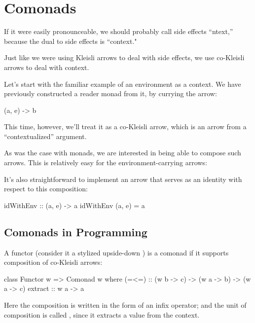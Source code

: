 \documentclass[DaoFP]{subfiles}
\begin{document}
\setcounter{chapter}{15}

\chapter{Comonads}

If it were easily pronounceable, we should probably call side effects ``ntext,'' because the dual to side effects is ``context."

Just like we were using Kleisli arrows to deal with side effects, we use co-Kleisli arrows to deal with context. 

Let's start with the familiar example of an environment as a context. We have previously constructed a reader monad from it, by currying the arrow:
\begin{haskell}
(a, e) -> b
\end{haskell}
This time, however, we'll treat it as a co-Kleisli arrow, which is an arrow from a ``contextualized'' argument.

As was the case with monads, we are interested in being able to compose such arrows. This is relatively easy for the environment-carrying arrows:

It's also straightforward to implement an arrow that serves as an identity with respect to this composition:

\begin{haskell}
idWithEnv :: (a, e) -> a
idWithEnv (a, e) = a
\end{haskell}

\section{Comonads in Programming}

A functor  (consider it a stylized upside-down ) is a comonad if it supports composition of co-Kleisli arrows:

\begin{haskell}
class Functor w => Comonad w where
   (=<=) :: (w b -> c) -> (w a -> b) -> (w a -> c)
   extract :: w a -> a
\end{haskell}
Here the composition is written in the form of an infix operator; and the unit of composition is called , since it extracts a value from the context. 
\end{document}
